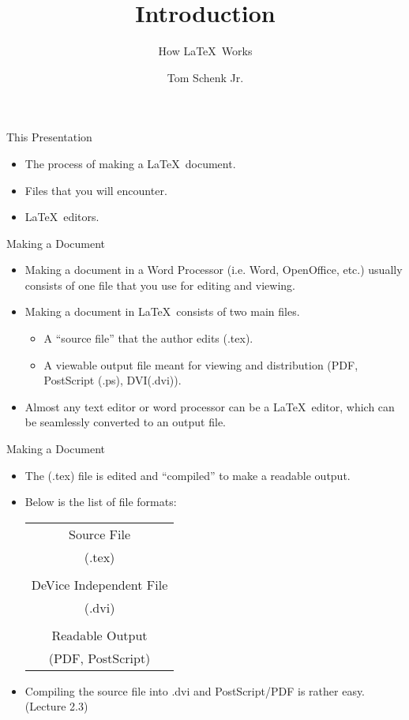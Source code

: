 \documentclass[pdf]{prosper}
\title{Introduction}
\subtitle{How \LaTeX\ Works}
\author{Tom Schenk Jr.}		%
\begin{document}
\maketitle
\begin{slide}{This Presentation}
	\begin{itemize}
		\item The process of making a \LaTeX\ document.
		\item Files that you will encounter.
		\item \LaTeX\ editors.
	\end{itemize}
\end{slide}
\begin{slide}{Making a Document}
	\begin{itemize}
		\item Making a document in a Word Processor (i.e. Word, OpenOffice, etc.) usually consists of one file that you use for editing and viewing.
		\item Making a document in \LaTeX\ consists of two main files.
			\begin{itemize}
				\item A ``source file'' that the author edits (.tex).
				\item A viewable output file meant for viewing and distribution (PDF, PostScript (.ps), DVI(.dvi)).
			\end{itemize}
		\item Almost any text editor or word processor can be a \LaTeX\ editor, which can be seamlessly converted to an output file.
	\end{itemize}
\end{slide}
\begin{slide}{Making a Document}
	\begin{itemize}
		\item The (.tex) file is edited and ``compiled'' to make a readable output.
		\item Below is the list of file formats: \\
\begin{tabular}{|c|}
\hline
Source File \\
(.tex) \\
\hline \\
DeVice Independent File \\
(.dvi) \\
\hline \\
Readable Output \\
(PDF, PostScript) \\
\hline
\end{tabular}
		\item Compiling the source file into .dvi and PostScript/PDF is rather easy. (Lecture 2.3)
	\end{itemize}
\end{slide}
\end{document}
